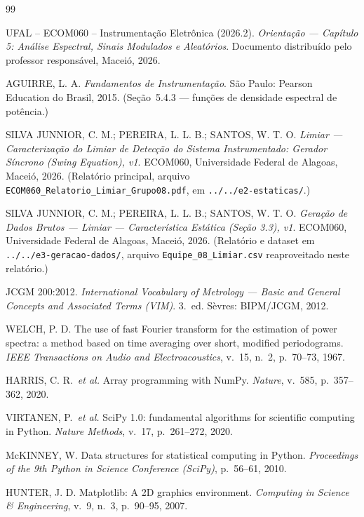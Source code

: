 \begin{thebibliography}{99}

UFAL -- ECOM060 -- Instrumentação Eletrônica (2026.2).
\emph{Orientação --- Capítulo 5: Análise Espectral, Sinais Modulados e Aleatórios}.
Documento distribuído pelo professor responsável, Maceió, 2026.

AGUIRRE, L. A.
\emph{Fundamentos de Instrumentação}. São Paulo: Pearson Education do Brasil, 2015.
(Seção~5.4.3 --- funções de densidade espectral de potência.)

SILVA JUNNIOR, C. M.; PEREIRA, L. L. B.; SANTOS, W. T. O.
\emph{Limiar --- Caracterização do Limiar de Detecção do Sistema Instrumentado: Gerador
Síncrono (Swing Equation), v1}. ECOM060, Universidade Federal de Alagoas, Maceió, 2026.
(Relatório principal, arquivo \texttt{ECOM060\_Relatorio\_Limiar\_Grupo08.pdf}, em
\texttt{../../e2-estaticas/}.)

SILVA JUNNIOR, C. M.; PEREIRA, L. L. B.; SANTOS, W. T. O.
\emph{Geração de Dados Brutos --- Limiar --- Característica Estática (Seção 3.3), v1}. ECOM060,
Universidade Federal de Alagoas, Maceió, 2026.
(Relatório e dataset em \texttt{../../e3-geracao-dados/}, arquivo
\texttt{Equipe\_08\_Limiar.csv} reaproveitado neste relatório.)

JCGM 200:2012.
\emph{International Vocabulary of Metrology --- Basic and General Concepts and Associated Terms
(VIM)}. 3.~ed. Sèvres: BIPM/JCGM, 2012.

WELCH, P. D.
The use of fast Fourier transform for the estimation of power spectra: a method based on time
averaging over short, modified periodograms.
\emph{IEEE Transactions on Audio and Electroacoustics}, v.~15, n.~2, p.~70--73, 1967.

HARRIS, C. R.\ \emph{et al.}
Array programming with NumPy. \emph{Nature}, v.~585, p.~357--362, 2020.

VIRTANEN, P.\ \emph{et al.}
SciPy 1.0: fundamental algorithms for scientific computing in Python.
\emph{Nature Methods}, v.~17, p.~261--272, 2020.

McKINNEY, W.
Data structures for statistical computing in Python.
\emph{Proceedings of the 9th Python in Science Conference (SciPy)}, p.~56--61, 2010.

HUNTER, J. D.
Matplotlib: A 2D graphics environment.
\emph{Computing in Science \& Engineering}, v.~9, n.~3, p.~90--95, 2007.

\end{thebibliography}
